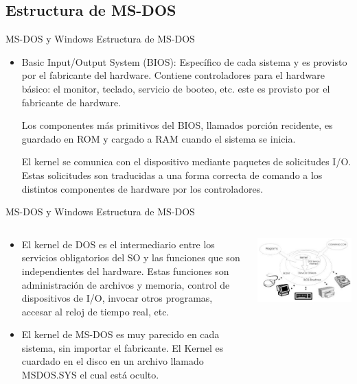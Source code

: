 \documentclass[11pt]{beamer}
\begin{document}
	\subsection{Estructura de MS-DOS}
		\begin{frame}{MS-DOS y Windows}
			Estructura de MS-DOS
			\begin{itemize}
				\item Basic Input/Output System (BIOS): Específico de cada sistema y es provisto por el fabricante del hardware. Contiene controladores para el hardware básico: el monitor, teclado, servicio de booteo, etc. este es provisto por el fabricante de hardware.
				
				Los componentes más primitivos del BIOS, llamados porción recidente, es guardado en ROM y cargado a RAM cuando el sistema se inicia.
				
				El kernel se comunica con el dispositivo mediante paquetes de solicitudes I/O.  Estas solicitudes son traducidas a una forma correcta de comando a los distintos componentes de hardware por los controladores.
			\end{itemize}
		\end{frame}
		\begin{frame}{MS-DOS y Windows}
			Estructura de MS-DOS
			\begin{columns}
				\begin{column}{0.5\textwidth}
					\scriptsize
					\begin{itemize}
						\item El kernel de DOS es el intermediario entre los servicios obligatorios del SO y las funciones que son independientes del hardware. Estas funciones son administración de archivos y memoria, control de dispositivos de I/O, invocar otros programas, accesar al reloj de tiempo real, etc.
						\item El kernel de MS-DOS es muy parecido en cada sistema, sin importar el fabricante. El Kernel es cuardado en el disco en un archivo llamado MSDOS.SYS el cual está oculto.
					\end{itemize}
				\end{column}
				\begin{column}{0.5\textwidth}
					\includegraphics[scale=0.3]{kernel.jpg}
				\end{column}
			\end{columns}
		\end{frame}
\end{document}
